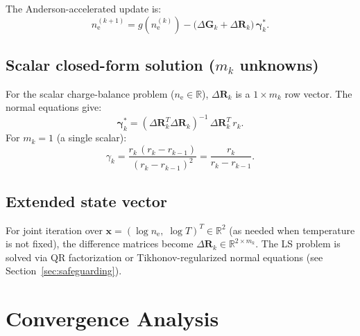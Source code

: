 \documentclass[11pt]{article}
\newcommand{\ne}{n_\mathrm{e}}
\newcommand{\bgamma}{\boldsymbol{\gamma}}
\newcommand{\DR}{\Delta\mathbf{R}}
\newcommand{\DG}{\Delta\mathbf{G}}
\begin{document}
The Anderson-accelerated update is:
%
\begin{equation}
  \label{eq:unconstrained-update}
  \boxed{
    \ne^{(k+1)} = g(\ne^{(k)}) - \bigl(\DG_k + \DR_k\bigr)\,\bgamma_k^*.
  }
\end{equation}
%


\subsection{Scalar closed-form solution ($m_k$ unknowns)}

For the scalar charge-balance problem ($\ne \in \mathbb{R}$), $\DR_k$
is a $1 \times m_k$ row vector.  The normal equations give:
%
\begin{equation}
  \label{eq:normal-equations}
  \bgamma_k^* = (\DR_k^T \DR_k)^{-1}\,\DR_k^T\,r_k.
\end{equation}
%
For $m_k = 1$ (a single scalar):
%
\begin{equation}
  \label{eq:gamma-m1}
  \gamma_k = \frac{r_k\,(r_k - r_{k-1})}{(r_k - r_{k-1})^2}
           = \frac{r_k}{r_k - r_{k-1}}.
\end{equation}
%

\subsection{Extended state vector}

For joint iteration over $\mathbf{x} = (\log \ne,\;\log T)^T \in \mathbb{R}^2$
(as needed when temperature is not fixed), the difference matrices become
$\DR_k \in \mathbb{R}^{2 \times m_k}$.  The LS problem is solved via
QR factorization or Tikhonov-regularized normal equations (see
Section~\ref{sec:safeguarding}).


\section{Convergence Analysis}
\label{sec:convergence}
\end{document}

